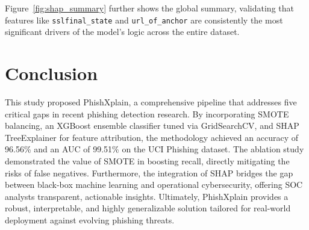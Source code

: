 Figure~\ref{fig:shap_summary} further shows the global summary, validating that features like \texttt{sslfinal\_state} and \texttt{url\_of\_anchor} are consistently the most significant drivers of the model's logic across the entire dataset.

\section{Conclusion}
\label{sec:conclusion}
This study proposed PhishXplain, a comprehensive pipeline that addresses five critical gaps in recent phishing detection research. By incorporating SMOTE balancing, an XGBoost ensemble classifier tuned via GridSearchCV, and SHAP TreeExplainer for feature attribution, the methodology achieved an accuracy of 96.56\% and an AUC of 99.51\% on the UCI Phishing dataset. The ablation study demonstrated the value of SMOTE in boosting recall, directly mitigating the risks of false negatives. Furthermore, the integration of SHAP bridges the gap between black-box machine learning and operational cybersecurity, offering SOC analysts transparent, actionable insights. Ultimately, PhishXplain provides a robust, interpretable, and highly generalizable solution tailored for real-world deployment against evolving phishing threats.

